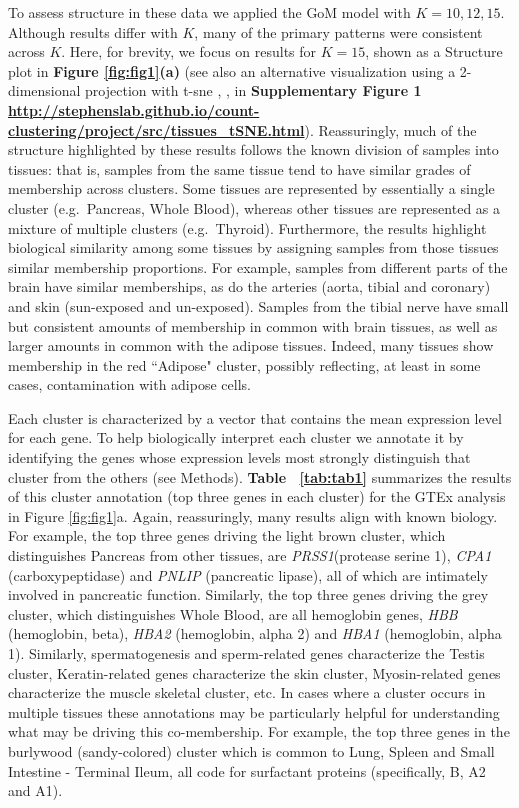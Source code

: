 To assess structure in these data we applied the GoM model with $K=10,12,15$. Although results differ with $K$, many of the primary patterns were consistent across $K$. Here, for brevity, we focus on results for $K=15$, shown as a Structure plot in \textbf{Figure \ref{fig:fig1}(a)} (see also an alternative visualization using a 2-dimensional projection with t-sne \cite{Maaten2008}, \cite{Maaten2014}, in \textbf{Supplementary Figure 1 \url{http://stephenslab.github.io/count-clustering/project/src/tissues_tSNE.html}}). Reassuringly, much of the structure highlighted by these results follows the known division of samples into tissues: that is, samples from the same tissue tend to have similar grades of membership across clusters. Some tissues are represented by essentially a single cluster (e.g.~Pancreas, Whole Blood), whereas other tissues are represented as a mixture of multiple clusters (e.g.~Thyroid). Furthermore, the results highlight biological similarity among some tissues by assigning samples from those tissues similar membership proportions. For example, samples from different parts of the brain have similar memberships, as do the arteries (aorta, tibial and coronary) and skin (sun-exposed and un-exposed). 
 Samples from the tibial nerve have small but consistent amounts of membership in common with brain tissues, as well as larger amounts in common with the adipose tissues. Indeed, many tissues show membership in the red ``Adipose" cluster, possibly reflecting, at least in some cases, contamination with adipose cells.

 
Each cluster is characterized by a vector that contains the mean expression level for each gene. To help biologically interpret each cluster we annotate it by identifying the genes whose expression levels most strongly distinguish that cluster from the others (see Methods).  \textbf{Table ~\ref{tab:tab1}} summarizes the results of this cluster annotation (top three genes in each cluster) for the GTEx analysis in Figure \ref{fig:fig1}a.  Again, reassuringly, many results align with known biology. For example,  the top three genes driving the light brown cluster, which distinguishes Pancreas from other tissues, are  \textit{PRSS1}(protease serine 1), \textit{CPA1} (carboxypeptidase) and \textit{PNLIP} (pancreatic lipase), all of which are intimately involved in pancreatic function. Similarly, the top three genes driving the grey cluster, which distinguishes Whole Blood, are all hemoglobin genes, \textit{HBB} (hemoglobin, beta), \textit{HBA2} (hemoglobin, alpha 2) and \textit{HBA1} (hemoglobin, alpha 1).  Similarly, spermatogenesis and sperm-related genes characterize the Testis cluster, Keratin-related genes characterize the skin cluster, Myosin-related genes characterize the muscle skeletal cluster, etc. In cases where a cluster occurs in multiple tissues these annotations may be particularly helpful for understanding what may be driving this co-membership. For example, the top three genes in the  burlywood (sandy-colored) cluster  which is common to Lung, Spleen and Small Intestine - Terminal Ileum, all code for surfactant proteins (specifically, B, A2 and A1).



